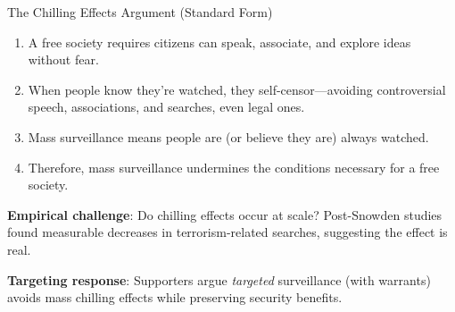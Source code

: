 ﻿\documentclass[aspectratio=169,11pt]{beamer}
\begin{document}
\begin{frame}{The Chilling Effects Argument (Standard Form)}
\begin{objectionbox}
\scriptsize
\begin{enumerate}
    \item A free society requires citizens can speak, associate, and explore ideas without fear.
    \item When people know they're watched, they self-censor---avoiding controversial speech, associations, and searches, even legal ones.
    \item Mass surveillance means people are (or believe they are) always watched.
    \item Therefore, mass surveillance undermines the conditions necessary for a free society.
\end{enumerate}
\end{objectionbox}

\vspace{0.05em}
\begin{probox}[Response]
\scriptsize
\textbf{Empirical challenge}: Do chilling effects occur at scale? Post-Snowden studies found measurable decreases in terrorism-related searches, suggesting the effect is real.

\textbf{Targeting response}: Supporters argue \emph{targeted} surveillance (with warrants) avoids mass chilling effects while preserving security benefits.
\end{probox}
\end{frame}
\end{document}
